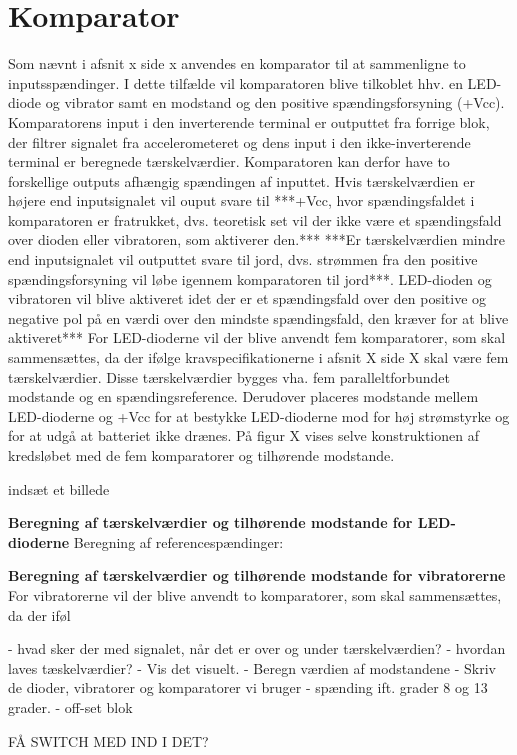 \section{Komparator}
Som nævnt i afsnit x side x anvendes en komparator til at sammenligne to inputsspændinger. I dette tilfælde vil komparatoren blive tilkoblet hhv. en LED-diode og vibrator samt en modstand og den positive spændingsforsyning (+Vcc). Komparatorens input i den inverterende terminal er outputtet fra forrige blok, der filtrer signalet fra accelerometeret og dens input i den ikke-inverterende terminal er beregnede tærskelværdier. Komparatoren kan derfor have to forskellige outputs afhængig spændingen af inputtet. Hvis tærskelværdien er højere end inputsignalet vil ouput svare til ***+Vcc, hvor spændingsfaldet i komparatoren er fratrukket, dvs. teoretisk set vil der ikke være et spændingsfald over dioden eller vibratoren, som aktiverer den.*** ***Er tærskelværdien mindre end inputsignalet vil outputtet svare til jord, dvs. strømmen fra den positive spændingsforsyning vil løbe igennem komparatoren til jord***. LED-dioden og vibratoren vil blive aktiveret idet der er et spændingsfald over den positive og negative pol på en værdi over den mindste spændingsfald, den kræver for at blive aktiveret***
For LED-dioderne vil der blive anvendt fem komparatorer, som skal sammensættes, da der ifølge kravspecifikationerne i afsnit X side X skal være fem tærskelværdier. Disse tærskelværdier bygges vha. fem paralleltforbundet modstande og en spændingsreference. Derudover placeres modstande mellem LED-dioderne og +Vcc for at bestykke LED-dioderne mod for høj strømstyrke og for at udgå at batteriet ikke drænes. På figur X vises selve konstruktionen af kredsløbet med de fem komparatorer og tilhørende modstande.

indsæt et billede

\textbf{Beregning af tærskelværdier og tilhørende modstande for LED-dioderne}
Beregning af referencespændinger: 

\textbf{Beregning af tærskelværdier og tilhørende modstande for vibratorerne}
For vibratorerne vil der blive anvendt to komparatorer, som skal sammensættes, da der iføl


- hvad sker der med signalet, når det er over og under tærskelværdien? 
- hvordan laves tæskelværdier?
- Vis det visuelt. 
- Beregn værdien af modstandene
- Skriv de dioder, vibratorer og komparatorer vi bruger 
- spænding ift. grader 8 og 13 grader. 
- off-set blok 


FÅ SWITCH MED IND I DET? 